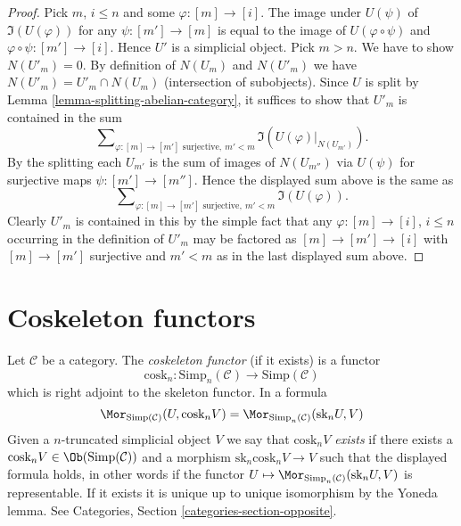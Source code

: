 \begin{proof}
Pick $m$, $i \leq n$ and some $\varphi : [m] \to [i]$.
The image under $U(\psi)$ of $\Im(U(\varphi))$
for any $\psi : [m'] \to [m]$ is
equal to the image of $U(\varphi \circ \psi)$ and
$\varphi \circ \psi : [m'] \to [i]$.
Hence $U'$ is a simplicial object.
Pick $m > n$. We have to show $N(U'_m) = 0$.
By definition of $N(U_m)$ and $N(U'_m)$ we have
$N(U'_m) = U'_m \cap N(U_m)$ (intersection of subobjects).
Since $U$ is split by Lemma \ref{lemma-splitting-abelian-category},
it suffices to show that $U'_m$ is contained in the sum
$$
\sum\nolimits_{\varphi : [m] \to [m']\text{ surjective}, \ m' < m}
\Im(U(\varphi)|_{N(U_{m'})}).
$$
By the splitting each $U_{m'}$ is the sum of images of
$N(U_{m''})$ via $U(\psi)$ for surjective maps
$\psi : [m'] \to [m'']$. Hence the displayed sum above
is the same as
$$
\sum\nolimits_{\varphi : [m] \to [m']\text{ surjective}, \ m' < m}
\Im(U(\varphi)).
$$
Clearly $U'_m$ is contained in this by the simple fact that
any $\varphi : [m] \to [i]$, $i \leq n$ occurring in the definition
of $U'_m$ may be factored as
$[m] \to [m'] \to [i]$ with $[m] \to [m']$ surjective
and $m' < m$ as in the last displayed sum above.
\end{proof}




\section{Coskeleton functors}
\label{section-coskeleton}

\noindent
Let $\mathcal{C}$ be a category.
The {\it coskeleton functor} (if it exists) is a functor
$$
\text{cosk}_n :
\text{Simp}_n(\mathcal{C}) \longrightarrow \text{Simp}(\mathcal{C})
$$
which is right adjoint to the skeleton functor. In a formula
\begin{equation}
\label{equation-cosk}
\Mor_{\text{Simp}(\mathcal{C})}(U, \text{cosk}_n V)
=
\Mor_{\text{Simp}_n(\mathcal{C})}(\text{sk}_n U, V)
\end{equation}
Given a $n$-truncated simplicial object $V$ we
say that {\it $\text{cosk}_nV$ exists} if there
exists a $\text{cosk}_nV \in \Ob(\text{Simp}(\mathcal{C}))$
and a morphism $\text{sk}_n \text{cosk}_n V \to V$
such that the displayed formula holds, in other words
if the functor
$U \mapsto \Mor_{\text{Simp}_n(\mathcal{C})}(\text{sk}_n U, V)$
is representable. If it exists it
is unique up to unique isomorphism by the Yoneda lemma.
See Categories, Section \ref{categories-section-opposite}.

